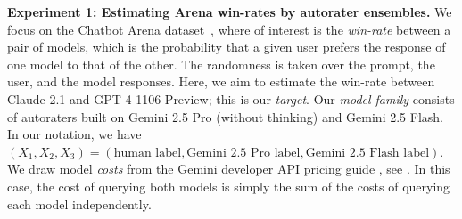 \documentclass{article} %
\begin{document}
\textbf{Experiment 1: Estimating Arena win-rates by autorater ensembles.}
We focus on the Chatbot Arena dataset~\citep{chiang2024chatbot}, where of interest is the \emph{win-rate} between a pair of models, which is the probability that a given user prefers the response of one model to that of the other. The randomness is taken over the prompt, the user, and the model responses. Here, we aim to estimate the win-rate between Claude-2.1 and GPT-4-1106-Preview; this is our \emph{target}. Our \emph{model family} consists of autoraters built on Gemini 2.5 Pro (without thinking) and Gemini 2.5 Flash. In our notation, we have $(X_1,X_2,X_3)=(\textrm{human label}, \textrm{Gemini 2.5 Pro label}, \textrm{Gemini 2.5 Flash label})$. We draw model \emph{costs} from the Gemini developer API pricing guide \citep{gemini}, see . In this case, the cost of querying both models is simply the sum of the costs of querying each model independently. %

\end{document}
